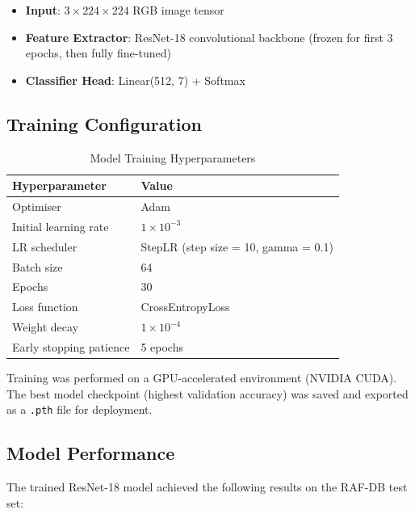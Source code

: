 \begin{itemize}
    \item \textbf{Input}: $3 \times 224 \times 224$ RGB image tensor
    \item \textbf{Feature Extractor}: ResNet-18 convolutional backbone
          (frozen for first 3 epochs, then fully fine-tuned)
    \item \textbf{Classifier Head}: Linear(512, 7) + Softmax
\end{itemize}

\subsection{Training Configuration}

\begin{table}[H]
\centering
\caption{Model Training Hyperparameters}
\begin{tabular}{ll}
\toprule
\textbf{Hyperparameter} & \textbf{Value} \\
\midrule
Optimiser               & Adam \\
Initial learning rate   & $1 \times 10^{-3}$ \\
LR scheduler            & StepLR (step size = 10, gamma = 0.1) \\
Batch size              & 64 \\
Epochs                  & 30 \\
Loss function           & CrossEntropyLoss \\
Weight decay            & $1 \times 10^{-4}$ \\
Early stopping patience & 5 epochs \\
\bottomrule
\end{tabular}
\end{table}

Training was performed on a GPU-accelerated environment (NVIDIA CUDA).
The best model checkpoint (highest validation accuracy) was saved and
exported as a \texttt{.pth} file for deployment.

\subsection{Model Performance}

The trained ResNet-18 model achieved the following results on the RAF-DB test set:

